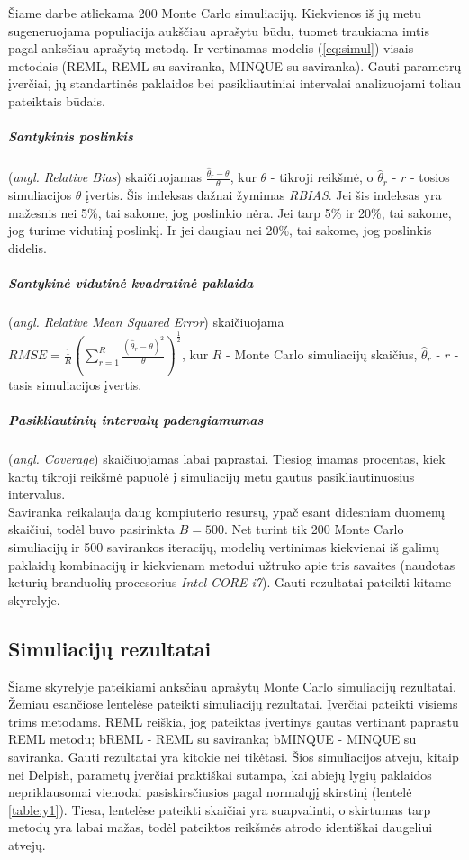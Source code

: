 \documentclass[12pt,a4paper]{article}
\begin{document}
\indent Šiame darbe atliekama 200 Monte Carlo simuliacijų. Kiekvienos iš jų metu sugeneruojama populiacija aukščiau aprašytu būdu, tuomet traukiama imtis pagal anksčiau aprašytą metodą. Ir vertinamas modelis (\ref{eq:simul}) visais metodais (REML, REML su saviranka, MINQUE su saviranka). Gauti parametrų įverčiai, jų standartinės paklaidos bei pasikliautiniai intervalai analizuojami toliau pateiktais būdais.

\subparagraph{Santykinis poslinkis} (\textit{angl. Relative Bias}) skaičiuojamas $\frac{\hat{\theta}_r-\theta}{\theta}$, kur $\theta$ - tikroji reikšmė, o $\hat{\theta}_r$ - $r$ - tosios simuliacijos $\theta$ įvertis. Šis indeksas dažnai žymimas \textit{RBIAS}. Jei šis indeksas yra mažesnis nei 5\%, tai sakome, jog poslinkio nėra. Jei tarp 5\% ir 20\%, tai sakome, jog turime vidutinį poslinkį. Ir jei daugiau nei 20\%, tai sakome, jog poslinkis didelis.

\subparagraph{Santykinė vidutinė kvadratinė paklaida} (\textit{angl. Relative Mean Squared Error}) skaičiuojama $RMSE=\frac{1}{R}\left(\sum^R_{r=1}\frac{(\hat{\theta}_r-\theta)^2}{\theta}\right)^\frac{1}{2}$, kur $R$ - Monte Carlo simuliacijų skaičius, $\hat{\theta}_r$ - $r$ - tasis simuliacijos įvertis.

\subparagraph{Pasikliautinių intervalų padengiamumas} (\textit{angl. Coverage}) skaičiuojamas labai paprastai. Tiesiog imamas procentas, kiek kartų tikroji reikšmė papuolė į simuliacijų metu gautus pasikliautinuosius intervalus.\\

\indent Saviranka reikalauja daug kompiuterio resursų, ypač esant didesniam duomenų skaičiui, todėl buvo pasirinkta $B=500$. Net turint tik 200 Monte Carlo simuliacijų ir 500 savirankos iteracijų, modelių vertinimas kiekvienai iš galimų paklaidų kombinacijų ir kiekvienam metodui užtruko apie tris savaites (naudotas keturių branduolių procesorius \textit{Intel CORE i7}). Gauti rezultatai pateikti kitame skyrelyje.

\subsection{Simuliacijų rezultatai}
\indent Šiame skyrelyje pateikiami anksčiau aprašytų Monte Carlo simuliacijų rezultatai. Žemiau esančiose lentelėse pateikti simuliacijų rezultatai. Įverčiai pateikti visiems trims metodams. REML reiškia, jog pateiktas įvertinys gautas vertinant paprastu REML metodu; bREML - REML su saviranka; bMINQUE - MINQUE su saviranka. Gauti rezultatai yra kitokie nei tikėtasi. Šios simuliacijos atveju, kitaip nei Delpish, parametų įverčiai praktiškai sutampa, kai abiejų lygių paklaidos nepriklausomai vienodai pasiskirsčiusios pagal normalųjį skirstinį (lentelė \ref{table:y1}). Tiesa, lentelėse pateikti skaičiai yra suapvalinti, o skirtumas tarp metodų yra labai mažas, todėl pateiktos reikšmės atrodo identiškai daugeliui atvejų. 
\end{document}
